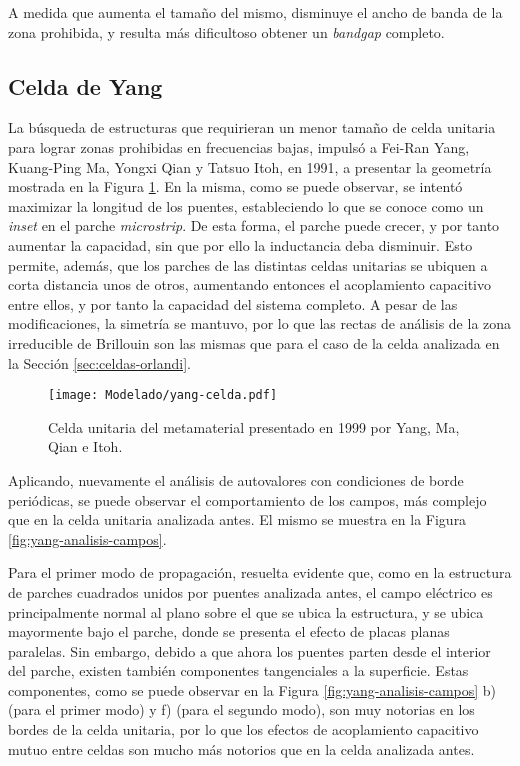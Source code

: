 A medida que aumenta el tamaño del mismo, disminuye el ancho de banda de la zona prohibida, y resulta más dificultoso obtener un \textit{bandgap} completo.

\clearpage

\subsection{Celda de Yang}
\label{sec:celda-yang}

La búsqueda de estructuras que requirieran un menor tamaño de celda unitaria para lograr zonas prohibidas en frecuencias bajas, impulsó a Fei-Ran Yang, Kuang-Ping Ma, Yongxi Qian y Tatsuo Itoh, en 1991, a presentar \cite{Yang:UCPBG} la geometría mostrada en la Figura \ref{fig:celda-yang}. En la misma, como se puede observar, se intentó maximizar la longitud de los puentes, estableciendo lo que se conoce como un \textit{inset} en el parche \textit{microstrip}. De esta forma, el parche puede crecer, y por tanto aumentar la capacidad, sin que por ello la inductancia deba disminuir. Esto permite, además, que los parches de las distintas celdas unitarias se ubiquen a corta distancia unos de otros, aumentando entonces el acoplamiento capacitivo entre ellos, y por tanto la capacidad del sistema completo. A pesar de las modificaciones, la simetría se mantuvo, por lo que las rectas de análisis de la zona irreducible de Brillouin son las mismas que para el caso de la celda analizada en la Sección \ref{sec:celdas-orlandi}.

\begin{figure}[h]
	\centering
	\texttt{[image: Modelado/yang-celda.pdf]}
	\caption{Celda unitaria del metamaterial presentado en 1999 por Yang, Ma, Qian e Itoh.}
	\label{fig:celda-yang}
\end{figure}

Aplicando, nuevamente el análisis de autovalores con condiciones de borde periódicas, se puede observar el comportamiento de los campos, más complejo que en la celda unitaria analizada antes. El mismo se muestra en la Figura \ref{fig:yang-analisis-campos}.

Para el primer modo de propagación, resuelta evidente que, como en la estructura de parches cuadrados unidos por puentes analizada antes, el campo eléctrico es principalmente normal al plano sobre el que se ubica la estructura, y se ubica mayormente bajo el parche, donde se presenta el efecto de placas planas paralelas. Sin embargo, debido  a que ahora los puentes parten desde el interior del parche, existen también componentes tangenciales a la superficie. Estas componentes, como se puede observar en la Figura \ref{fig:yang-analisis-campos} b) (para el primer modo) y f) (para el segundo modo), son muy notorias en los bordes de la celda unitaria, por lo que los efectos de acoplamiento capacitivo mutuo entre celdas son mucho más notorios que en la celda analizada antes.

